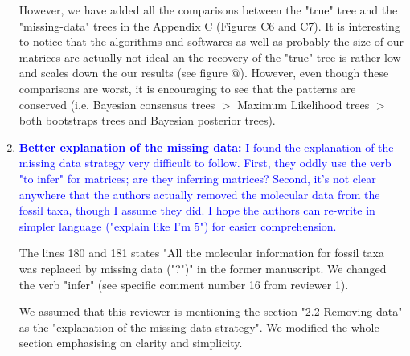 \documentclass[12pt,letterpaper]{article}
\begin{document}
\begin{enumerate}
However, we have added all the comparisons between the "true" tree and the "missing-data" trees in the Appendix C (Figures C6 and C7).
It is interesting to notice that the algorithms and softwares as well as probably the size of our matrices are actually not ideal an the recovery of the "true" tree is rather low and scales down the our results (see figure @).
However, even though these comparisons are worst, it is encouraging to see that the patterns are conserved (i.e. Bayesian consensus trees $>$ Maximum Likelihood trees $>$ both bootstraps trees and Bayesian posterior trees).

\item{\textcolor{blue}{\textbf{Better explanation of the missing data:} I found the explanation of the missing data strategy very difficult to follow. First, they oddly use the verb "to infer" for matrices; are they inferring matrices? Second, it's not clear anywhere that the authors actually removed the molecular data from the fossil taxa, though I assume they did. I hope the authors can re-write in simpler language ("explain like I'm 5") for easier comprehension.}}

The lines 180 and 181 states "All the molecular information for fossil taxa was replaced by missing data ("?")" in the former manuscript. We changed the verb "infer" (see specific comment number 16 from reviewer 1).

We assumed that this reviewer is mentioning the section "2.2 Removing data" as the "explanation of the missing data strategy". We modified the whole section emphasising on clarity and simplicity.


\end{enumerate}
\end{document}
